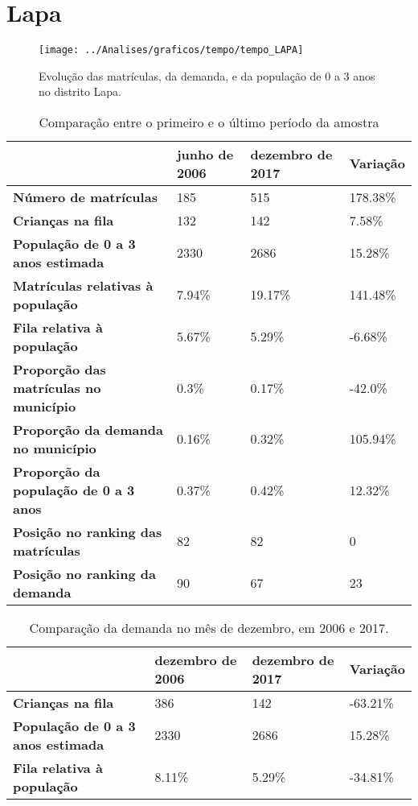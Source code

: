 \section{Lapa}
\begin{figure}[H]
\centering
\texttt{[image: ../Analises/graficos/tempo/tempo\_LAPA]}
\caption{Evolução das matrículas, da demanda, e da população de 0 a 3 anos no distrito Lapa.}
\end{figure}
\begin{table}[H]
\begin{tabular}{|l|l|l|l|}
\hline
\textbf{}                                      & \textbf{junho de 2006}       & \textbf{dezembro de 2017}    & \textbf{Variação} \\ \hline
\textbf{Número de matrículas}                  & 185 & 515 & 178.38\% \\ \hline
\textbf{Crianças na fila}                      & 132 & 142 & 7.58\% \\ \hline
\textbf{População de 0 a 3 anos estimada}      & 2330 & 2686 & 15.28\% \\ \hline
\textbf{Matrículas relativas à população}      & 7.94\% & 19.17\% & 141.48\% \\ \hline
\textbf{Fila relativa à população}             & 5.67\% & 5.29\% & -6.68\% \\ \hline
\textbf{Proporção das matrículas no município} & 0.3\% & 0.17\% & -42.0\% \\ \hline
\textbf{Proporção da demanda no município}     & 0.16\% & 0.32\% & 105.94\% \\ \hline
\textbf{Proporção da população de 0 a 3 anos}  & 0.37\% & 0.42\% & 12.32\% \\ \hline
\textbf{Posição no ranking das matrículas}     & 82 & 82 & 0 \\ \hline
\textbf{Posição no ranking da demanda}         & 90 & 67 & 23 \\ \hline
\end{tabular}
\caption{Comparação entre o primeiro e o último período da amostra}
\end{table}
\begin{table}[H]
\begin{tabular}{|l|l|l|l|}
\hline
\textbf{}                                 & \textbf{dezembro de 2006} & \textbf{dezembro de 2017} & \textbf{Variação} \\ \hline
\textbf{Crianças na fila}                      & 386 & 142 & -63.21\% \\ \hline
\textbf{População de 0 a 3 anos estimada}      & 2330 & 2686 & 15.28\% \\ \hline
\textbf{Fila relativa à população}             & 8.11\% & 5.29\% & -34.81\% \\ \hline
\end{tabular}
\caption{Comparação da demanda no mês de dezembro, em 2006 e 2017.}
\end{table}
